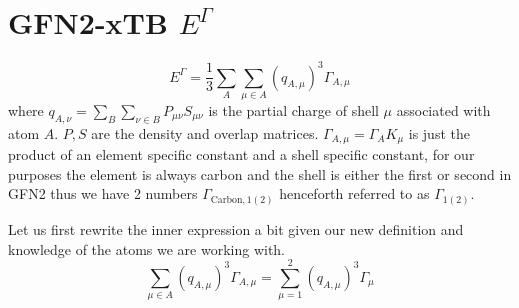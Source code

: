 \documentclass{article}
\begin{document}
\section{GFN2-xTB $E^\Gamma$}
\begin{equation}
    E^\Gamma = \frac{1}{3}\sum_A\sum_{\mu\in A} (q_{A,\mu})^3\Gamma_{A,\mu}
\end{equation}
where $q_{A,\nu}=\sum_B\sum_{\nu\in B}P_{\mu\nu}S_{\mu\nu}$ is the partial charge of shell $\mu$ associated with atom $A$. $P, S$ are the density and overlap matrices. $\Gamma_{A,\mu} = \Gamma_A K_\mu$ is just the product of an element specific constant and a shell specific constant, for our purposes the element is always carbon and the shell is either the first or second in GFN2 thus we have 2 numbers $\Gamma_{\text{Carbon},1(2)}$ henceforth referred to as $\varGamma_{1(2)}$. 

\vspace{\baselineskip}
\noindent
Let us first rewrite the inner expression a bit given our new definition and knowledge of the atoms we are working with. 
\begin{equation}
    \sum_{\mu\in A} (q_{A,\mu})^3\Gamma_{A,\mu} = \sum_{\mu = 1}^2 (q_{A,\mu})^3\varGamma_{\mu}
\end{equation}
\end{document}
